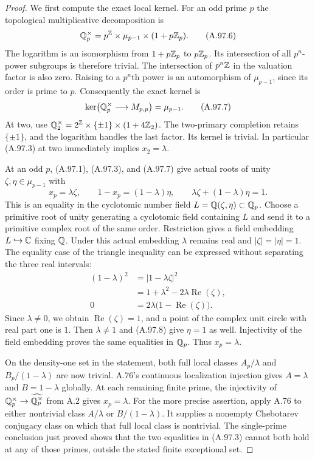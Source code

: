 \begin{proof}
We first compute the exact local kernel.  For an odd prime
$p$ the topological multiplicative decomposition is
\[
          \mathbb Q_p^\times
             =p^{\mathbb Z}\times\mu_{p-1}\times(1+p\mathbb Z_p).
\tag{A.97.6}
\]
The logarithm is an isomorphism from $1+p\mathbb Z_p$ to
$p\mathbb Z_p$.  Its intersection of all $p^n$-power subgroups
is therefore trivial.  The intersection of $p^n\mathbb Z$ in
the valuation factor is also zero.  Raising to a $p^n$th
power is an automorphism of $\mu_{p-1}$, since its order
is prime to $p$.  Consequently the exact kernel is
\[
       \ker\bigl(\mathbb Q_p^\times\longrightarrow M_{p,p}\bigr)
                         =\mu_{p-1}.
\tag{A.97.7}
\]
At two, use
$\mathbb Q_2^\times=2^{\mathbb Z}\times\{\pm1\}\times(1+4\mathbb Z_2)$.
The two-primary completion retains $\{\pm1\}$, and
the logarithm handles the last factor.  Its kernel is
trivial.  In particular (A.97.3) at two immediately
implies $x_2=\lambda$.

At an odd $p$, (A.97.1), (A.97.3), and (A.97.7) give
actual roots of unity $\zeta,\eta\in\mu_{p-1}$ with
\[
       x_p=\lambda\zeta,\qquad
       1-x_p=(1-\lambda)\eta,
       \qquad \lambda\zeta+(1-\lambda)\eta=1.
\tag{A.97.8}
\]
This is an equality in the cyclotomic number field
$L=\mathbb Q(\zeta,\eta)\subset\mathbb Q_p$.
Choose a primitive root of unity generating a cyclotomic
field containing $L$ and send it to a primitive complex
root of the same order.  Restriction gives a field
embedding $L\hookrightarrow\mathbb C$ fixing $\mathbb Q$.
Under this actual embedding $\lambda$ remains real and
$|\zeta|=|\eta|=1$.
The equality case of the triangle inequality can be
expressed without separating the three real intervals:
\[
 \begin{split}
   (1-\lambda)^2
      &=|1-\lambda\zeta|^2\\
      &=1+\lambda^2-2\lambda\operatorname{Re}(\zeta),\\
   0&=2\lambda\bigl(1-\operatorname{Re}(\zeta)\bigr).
 \end{split}
\tag{A.97.9}
\]
Since $\lambda\ne0$, we obtain
$\operatorname{Re}(\zeta)=1$, and a point of the complex
unit circle with real part one is $1$.
Then $\lambda\ne1$ and (A.97.8) give $\eta=1$ as well.
Injectivity of the field embedding proves the same
equalities in $\mathbb Q_p$.  Thus $x_p=\lambda$.

On the density-one set in the statement, both full local
classes $A_p/\lambda$ and $B_p/(1-\lambda)$ are now
trivial.  A.76's continuous localization injection gives
$A=\lambda$ and $B=1-\lambda$ globally.
At each remaining finite prime, the injectivity of
$\mathbb Q_p^\times\to\widehat{\mathbb Q_p^\times}$ from A.2 gives
$x_p=\lambda$.
For the more precise assertion, apply A.76 to either
nontrivial class $A/\lambda$ or $B/(1-\lambda)$.
It supplies a nonempty Chebotarev conjugacy class on
which that full local class is nontrivial.
The single-prime conclusion just proved shows that the
two equalities in (A.97.3) cannot both hold at any of
those primes, outside the stated finite exceptional set.


\end{proof}
